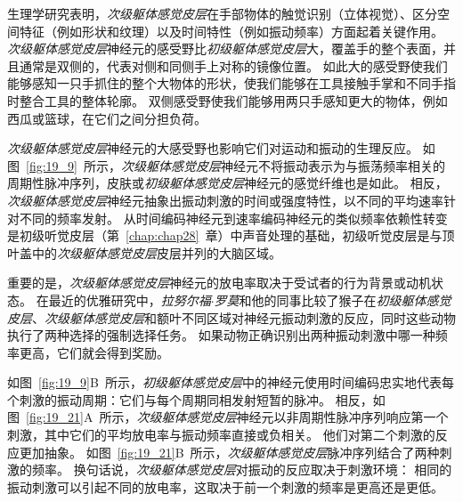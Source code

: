 生理学研究表明，\textit{次级躯体感觉皮层}在手部物体的触觉识别（立体视觉）、区分空间特征（例如形状和纹理）以及时间特性（例如振动频率）方面起着关键作用。
\textit{次级躯体感觉皮层}神经元的感受野比\textit{初级躯体感觉皮层}大，覆盖手的整个表面，并且通常是双侧的，代表对侧和同侧手上对称的镜像位置。
如此大的感受野使我们能够感知一只手抓住的整个大物体的形状，使我们能够在工具接触手掌和不同手指时整合工具的整体轮廓。
双侧感受野使我们能够用两只手感知更大的物体，例如西瓜或篮球，在它们之间分担负荷。


\textit{次级躯体感觉皮层}神经元的大感受野也影响它们对运动和振动的生理反应。
如图~\ref{fig:19_9}~所示，\textit{次级躯体感觉皮层}神经元不将振动表示为与振荡频率相关的周期性脉冲序列，皮肤或\textit{初级躯体感觉皮层}神经元的感觉纤维也是如此。
相反，\textit{次级躯体感觉皮层}神经元抽象出振动刺激的时间或强度特性，以不同的平均速率针对不同的频率发射。
从时间编码神经元到速率编码神经元的类似频率依赖性转变是初级听觉皮层（第~\ref{chap:chap28}~章）中声音处理的基础，初级听觉皮层是与顶叶盖中的\textit{次级躯体感觉皮层}皮层并列的大脑区域。


重要的是，\textit{次级躯体感觉皮层}神经元的放电率取决于受试者的行为背景或动机状态。
在最近的优雅研究中，\textit{拉努尔福$\cdot$罗莫}和他的同事比较了猴子在\textit{初级躯体感觉皮层}、\textit{次级躯体感觉皮层}和额叶不同区域对神经元振动刺激的反应，同时这些动物执行了两种选择的强制选择任务。
如果动物正确识别出两种振动刺激中哪一种频率更高，它们就会得到奖励。


如图~\ref{fig:19_9}B~所示，\textit{初级躯体感觉皮层}中的神经元使用时间编码忠实地代表每个刺激的振动周期：它们与每个周期同相发射短暂的脉冲。
相反，如图~\ref{fig:19_21}A~所示，\textit{次级躯体感觉皮层}神经元以非周期性脉冲序列响应第一个刺激，其中它们的平均放电率与振动频率直接或负相关。
他们对第二个刺激的反应更加抽象。
如图~\ref{fig:19_21}B~所示，\textit{次级躯体感觉皮层}脉冲序列结合了两种刺激的频率。
换句话说，\textit{次级躯体感觉皮层}对振动的反应取决于刺激环境：
相同的振动刺激可以引起不同的放电率，这取决于前一个刺激的频率是更高还是更低。


